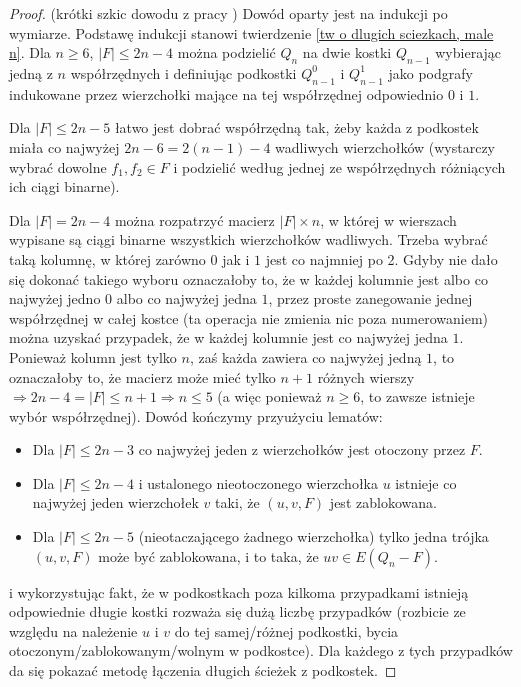 \documentclass{pracamgr}
\begin{document}
   \begin{proof}
    (krótki szkic dowodu z pracy \cite{FG})\newline
    Dowód oparty jest na indukcji po wymiarze.
    Podstawę indukcji stanowi twierdzenie \ref{tw o dlugich sciezkach, male n}.
    Dla $n\ge6$, $|F|\le 2n-4$ można podzielić $Q_n$ na dwie kostki $Q_{n-1}$ wybierając jedną z $n$ współrzędnych 
    i definiując podkostki $Q^0_{n-1}$ i $Q^1_{n-1}$ jako podgrafy indukowane przez wierzchołki mające na tej współrzędnej odpowiednio $0$ i $1$.
    
    Dla $|F|\le 2n-5$ łatwo jest dobrać współrzędną tak, żeby każda z podkostek miała co najwyżej $2n-6=2(n-1)-4$ wadliwych wierzchołków
    (wystarczy wybrać dowolne $f_1,f_2\in F$ i podzielić według jednej ze współrzędnych różniących ich ciągi binarne).
    
    Dla $|F|=2n-4$ można rozpatrzyć macierz $|F|\times n$, w której w wierszach wypisane są ciągi binarne wszystkich wierzchołków wadliwych.
    Trzeba wybrać taką kolumnę, w której zarówno $0$ jak i $1$ jest co najmniej po 2. Gdyby nie dało się dokonać takiego wyboru oznaczałoby to, że
    w każdej kolumnie jest albo co najwyżej jedno $0$ albo co najwyżej jedna $1$, przez proste zanegowanie jednej współrzędnej w całej kostce
    (ta operacja nie zmienia nic poza numerowaniem) można uzyskać przypadek, że w każdej kolumnie jest co najwyżej jedna $1$. 
    Ponieważ kolumn jest tylko $n$, zaś każda zawiera co najwyżej jedną $1$, to oznaczałoby to, że macierz może mieć tylko $n+1$ różnych wierszy
    $\Rightarrow 2n-4=|F|\le n+1\Rightarrow n\le5$ (a więc ponieważ $n\ge 6$, to zawsze istnieje wybór współrzędnej).\newline
    Dowód kończymy przyużyciu lematów:
    \begin{itemize}
     \item Dla $|F|\le 2n-3$ co najwyżej jeden z wierzchołków jest otoczony przez $F$.
     \item Dla $|F|\le 2n-4$ i ustalonego nieotoczonego wierzchołka $u$ istnieje co najwyżej jeden wierzchołek $v$ taki, że $(u,v,F)$ jest zablokowana.
     \item Dla $|F|\le 2n-5$ (nieotaczającego żadnego wierzchołka) tylko jedna trójka $(u,v,F)$ może być zablokowana, i to taka, że $uv\in E(Q_n-F)$.
    \end{itemize}
    i wykorzystując fakt, że w podkostkach poza kilkoma przypadkami istnieją odpowiednie długie kostki rozważa się dużą liczbę przypadków
    (rozbicie ze względu na należenie $u$ i $v$ do tej samej/różnej podkostki, bycia otoczonym/zablokowanym/wolnym w podkostce).
    Dla każdego z tych przypadków da się pokazać metodę łączenia długich ścieżek z podkostek.
   \end{proof}   
\end{document}
